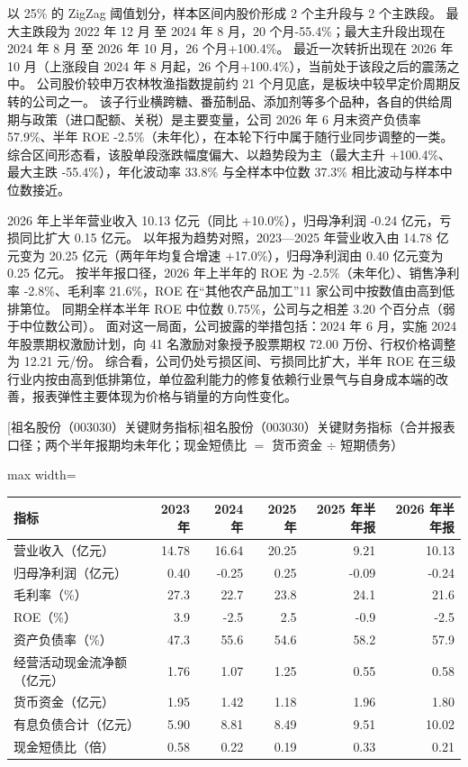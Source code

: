  以 25\% 的 ZigZag 阈值划分，样本区间内股价形成 2 个主升段与 2 个主跌段。 最大主跌段为 2022 年 12 月 至 2024 年 8 月，20 个月-55.4\%；最大主升段出现在 2024 年 8 月 至 2026 年 10 月，26 个月+100.4\%。 最近一次转折出现在 2026 年 10 月（上涨段自 2024 年 8 月起，26 个月+100.4\%），当前处于该段之后的震荡之中。 公司股价较申万农林牧渔指数提前约 21 个月见底，是板块中较早定价周期反转的公司之一。 该子行业横跨糖、番茄制品、添加剂等多个品种，各自的供给周期与政策（进口配额、关税）是主要变量，公司 2026 年 6 月末资产负债率 57.9\%、半年 ROE -2.5\%（未年化），在本轮下行中属于随行业同步调整的一类。 综合区间形态看，该股单段涨跌幅度偏大、以趋势段为主（最大主升 +100.4\%、最大主跌 -55.4\%），年化波动率 33.8\% 与全样本中位数 37.3\% 相比波动与样本中位数接近。

 2026 年上半年营业收入 10.13 亿元（同比 +10.0\%），归母净利润 -0.24 亿元，亏损同比扩大 0.15 亿元。 以年报为趋势对照，2023---2025 年营业收入由 14.78 亿元变为 20.25 亿元（两年年均复合增速 +17.0\%），归母净利润由 0.40 亿元变为 0.25 亿元。 按半年报口径，2026 年上半年的 ROE 为 -2.5\%（未年化）、销售净利率 -2.8\%、毛利率 21.6\%，ROE 在“其他农产品加工”11 家公司中按数值由高到低排第位。 同期全样本半年 ROE 中位数 0.75\%，公司与之相差 3.20 个百分点（弱于中位数公司）。 面对这一局面，公司披露的举措包括：2024 年 6 月，实施 2024 年股票期权激励计划，向 41 名激励对象授予股票期权 72.00 万份、行权价格调整为 12.21 元/份。 综合看，公司仍处亏损区间、亏损同比扩大，半年 ROE 在三级行业内按由高到低排第位，单位盈利能力的修复依赖行业景气与自身成本端的改善，报表弹性主要体现为价格与销量的方向性变化。

\begin{center}\small\setlength{\tabcolsep}{3.4pt}
[祖名股份（003030）关键财务指标]{祖名股份（003030）关键财务指标（合并报表口径；两个半年报期均未年化；现金短债比 $=$ 货币资金 $\div$ 短期债务）}
\begin{adjustbox}{max width=\textwidth}
\begin{tabular}{@{}lrrrrr@{}}
\toprule
指标 & 2023 年 & 2024 年 & 2025 年 & 2025 年半年报 & 2026 年半年报 \\
\midrule
营业收入（亿元） & 14.78 & 16.64 & 20.25 & 9.21 & 10.13 \\
归母净利润（亿元） & 0.40 & -0.25 & 0.25 & -0.09 & -0.24 \\
毛利率（\%） & 27.3 & 22.7 & 23.8 & 24.1 & 21.6 \\
ROE（\%） & 3.9 & -2.5 & 2.5 & -0.9 & -2.5 \\
资产负债率（\%） & 47.3 & 55.6 & 54.6 & 58.2 & 57.9 \\
经营活动现金流净额（亿元） & 1.76 & 1.07 & 1.25 & 0.55 & 0.58 \\
货币资金（亿元） & 1.95 & 1.42 & 1.18 & 1.96 & 1.80 \\
有息负债合计（亿元） & 5.90 & 8.81 & 8.49 & 9.51 & 10.02 \\
现金短债比（倍） & 0.58 & 0.22 & 0.19 & 0.33 & 0.21 \\
\bottomrule
\end{tabular}
\end{adjustbox}
\end{center}

